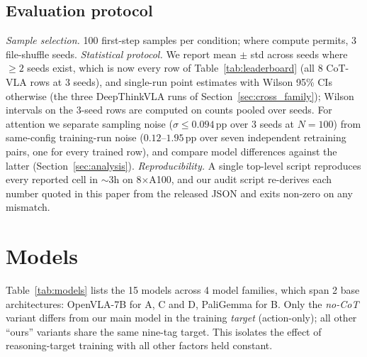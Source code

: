 \documentclass{article}
\begin{document}
\subsection{Evaluation protocol}
\emph{Sample selection.} 100 first-step samples per condition; where compute permits, 3 file-shuffle seeds. \emph{Statistical protocol.} We report mean $\pm$ std across seeds where $\geq 2$ seeds exist, which is now every row of Table~\ref{tab:leaderboard} (all 8 CoT-VLA rows at 3 seeds), and single-run point estimates with Wilson 95\% CIs otherwise (the three DeepThinkVLA runs of Section~\ref{sec:cross_family}); Wilson intervals on the 3-seed rows are computed on counts pooled over seeds. For attention we separate sampling noise ($\sigma \leq 0.094$\,pp over 3 seeds at $N{=}100$) from same-config training-run noise ($0.12$--$1.95$\,pp over seven independent retraining pairs, one for every trained row), and compare model differences against the latter (Section~\ref{sec:analysis}). \emph{Reproducibility.} A single top-level script reproduces every reported cell in $\sim$3h on 8$\times$A100, and our audit script re-derives each number quoted in this paper from the released JSON and exits non-zero on any mismatch.

\section{Models}
\label{sec:models}

Table~\ref{tab:models} lists the 15 models across 4 model families, which span 2 base architectures: OpenVLA-7B for A, C and D, PaliGemma for B. Only the \emph{no-CoT} variant differs from our main model in the training \emph{target} (action-only); all other ``ours'' variants share the same nine-tag target. This isolates the effect of reasoning-target training with all other factors held constant.
\end{document}
